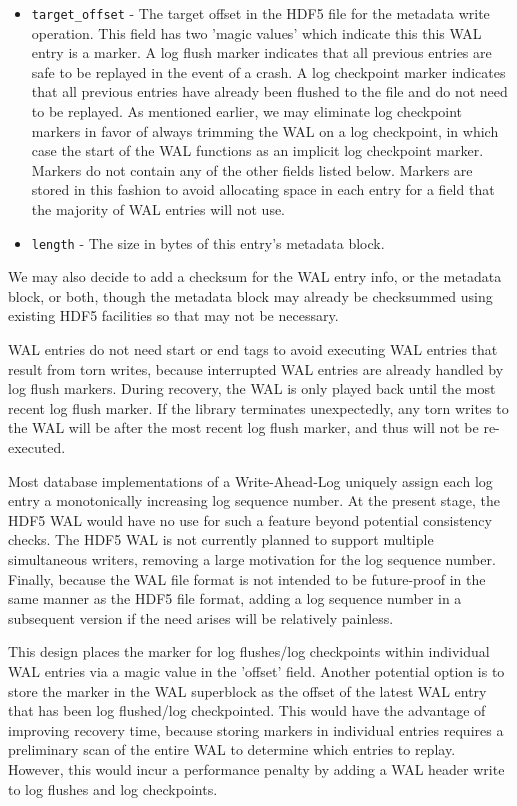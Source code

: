 \begin{itemize}

\item \texttt{target\_offset} - The target offset in the HDF5 file for the metadata write operation. This field has two 'magic values' which indicate this this WAL entry is a marker. A log flush marker indicates that all previous entries are safe to be replayed in the event of a crash. A log checkpoint marker indicates that all previous entries have already been flushed to the file and do not need to be replayed. As mentioned earlier, we may eliminate log checkpoint markers in favor of always trimming the WAL on a log checkpoint, in which case the start of the WAL functions as an implicit log checkpoint marker. Markers do not contain any of the other fields listed below. Markers are stored in this fashion to avoid allocating space in each entry for a field that the majority of WAL entries will not use.

\item \texttt{length} - The size in bytes of this entry's metadata block.

\end{itemize}

We may also decide to add a checksum for the WAL entry info, or the metadata block, or both, though the metadata block may already be checksummed using existing HDF5 facilities so that may not be necessary.

WAL entries do not need start or end tags to avoid executing WAL entries that result from torn writes, because interrupted WAL entries are already handled by log flush markers. During recovery, the WAL is only played back until the most recent log flush marker. If the library terminates unexpectedly, any torn writes to the WAL will be after the most recent log flush marker, and thus will not be re-executed.

Most database implementations of a Write-Ahead-Log uniquely assign each log entry a monotonically increasing log sequence number. At the present stage, the HDF5 WAL would have no use for such a feature beyond potential consistency checks. The HDF5 WAL is not currently planned to support multiple simultaneous writers, removing a large motivation for the log sequence number. Finally, because the WAL file format is not intended to be future-proof in the same manner as the HDF5 file format, adding a log sequence number in a subsequent version if the need arises will be relatively painless. 

This design places the marker for log flushes/log checkpoints within individual WAL entries via a magic value in the 'offset' field. Another potential option is to store the marker in the WAL superblock as the offset of the latest WAL entry that has been log flushed/log checkpointed. This would have the advantage of improving recovery time, because storing markers in individual entries requires a preliminary scan of the entire WAL to determine which entries to replay. However, this would incur a performance penalty  by adding a  WAL header write to log flushes and log checkpoints.

